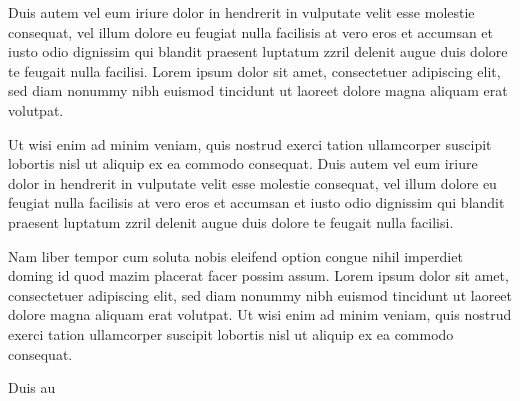 \documentclass{article}
\begin{document}
Duis autem vel eum iriure dolor in hendrerit in vulputate velit esse molestie consequat, vel illum dolore eu feugiat
nulla facilisis at vero eros et accumsan et iusto odio dignissim qui blandit praesent luptatum zzril delenit augue
duis dolore te feugait nulla facilisi. Lorem ipsum dolor sit amet, consectetuer adipiscing elit, sed diam nonummy
nibh euismod tincidunt ut laoreet dolore magna aliquam erat volutpat.

Ut wisi enim ad minim veniam, quis nostrud exerci tation ullamcorper suscipit lobortis nisl ut aliquip ex ea commodo
consequat. Duis autem vel eum iriure dolor in hendrerit in vulputate velit esse molestie consequat, vel illum dolore
eu feugiat nulla facilisis at vero eros et accumsan et iusto odio dignissim qui blandit praesent luptatum zzril
delenit augue duis dolore te feugait nulla facilisi.

Nam liber tempor cum soluta nobis eleifend option congue nihil imperdiet doming id quod mazim placerat facer possim
assum. Lorem ipsum dolor sit amet, consectetuer adipiscing elit, sed diam nonummy nibh euismod tincidunt ut laoreet
dolore magna aliquam erat volutpat. Ut wisi enim ad minim veniam, quis nostrud exerci tation ullamcorper suscipit
lobortis nisl ut aliquip ex ea commodo consequat.

Duis au
\end{document}
